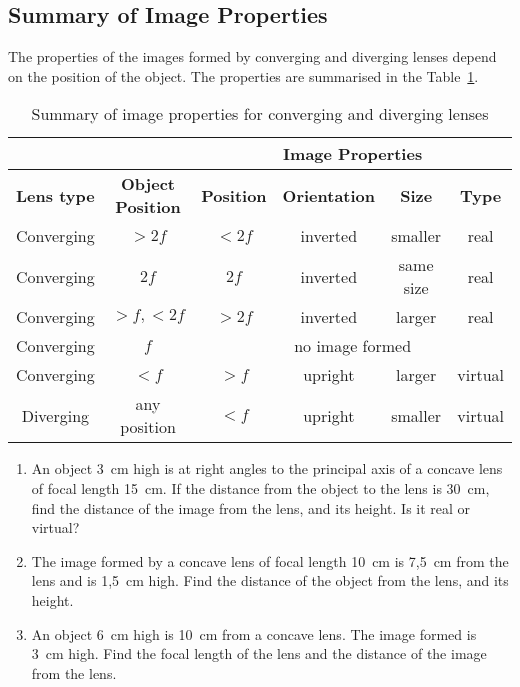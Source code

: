\subsection{Summary of Image Properties}
The properties of the images formed by converging and diverging lenses depend on the position of the object. The properties are summarised in the Table~\ref{tab:p:wsl:go11:l:summary}.

\begin{table}[htbp]
\begin{center}
\caption{Summary of image properties for converging and diverging lenses}
\label{tab:p:wsl:go11:l:summary}
\begin{tabular}{|c|c|c|c|c|c|}\hline
\multicolumn{2}{|c|}{}&\multicolumn{4}{c|}{\textbf{Image Properties}}\\\hline
\textbf{Lens type} & \textbf{Object Position} & \textbf{Position} & \textbf{Orientation} & \textbf{Size} & \textbf{Type}\\ \hline
Converging & $>2f$ & $<2f$ & inverted & smaller & real\\ \hline
Converging & $2f$ & $2f$ & inverted & same size & real\\ \hline
Converging & $>f,<2f$ & $>2f$ & inverted & larger & real\\ \hline
Converging & $f$ & \multicolumn{4}{c|}{no image formed}\\ \hline
Converging & $<f$ & $>f$ & upright & larger & virtual\\ \hline
Diverging & any position & $<f$ & upright & smaller& virtual\\

\hline
\end{tabular}
\end{center}
\end{table}

{
\begin{enumerate}
\item An object 3~cm high is at right angles to the principal axis of a concave lens of focal length 15~cm. If the distance from the object to the lens is 30~cm, find the distance of the image from the lens, and its height. Is it real or virtual?

\item The image formed by a concave lens of focal length 10~cm is 7,5~cm from the lens and is 1,5~cm high. Find the distance of the object from the lens, and its height.

\item An object 6~cm high is 10~cm from a concave lens. The image formed is 3~cm high. Find the focal length of the lens and the distance of the image from the lens.

\end{enumerate}
}

